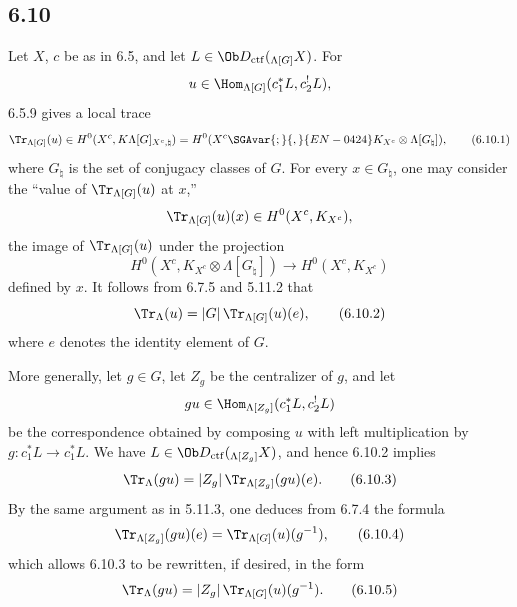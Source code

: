 \subsection*{6.10}
Let $X$, $c$ be as in 6.5, and let $L\in\Ob D_{\mathrm{ctf}}({}_{\Lambda[G]}X)$. For
\[
u\in\Hom_{\Lambda[G]}(c_1^*L,c_2^!L),
\]
6.5.9 gives a local trace
\begin{equation}
\Tr_{\Lambda[G]}(u)\in
H^0(X^c,K\Lambda[G]_{X^c,\natural})
=H^0(X^c\SGAvar{;}{,}{EN-0424}K_{X^c}\otimes\Lambda[G_{\natural}]),
\tag{6.10.1}
\end{equation}
where $G_{\natural}$ is the set of conjugacy classes of $G$. For every $x\in G_{\natural}$, one may consider the “value of $\Tr_{\Lambda[G]}(u)$ at $x$,”
\[
\Tr_{\Lambda[G]}(u)(x)\in H^0(X^c,K_{X^c}),
\]
the image of $\Tr_{\Lambda[G]}(u)$ under the projection
\[
H^0(X^c,K_{X^c}\otimes\Lambda[G_{\natural}])
\longrightarrow H^0(X^c,K_{X^c})
\]
defined by $x$. It follows from 6.7.5 and 5.11.2 that
\begin{equation}
\Tr_{\Lambda}(u)=|G|\,\Tr_{\Lambda[G]}(u)(e),
\tag{6.10.2}
\end{equation}
where $e$ denotes the identity element of $G$.

More generally, let $g\in G$, let $Z_g$ be the centralizer of $g$, and let
\[
gu\in\Hom_{\Lambda[Z_g]}(c_1^*L,c_2^!L)
\]
be the correspondence obtained by composing $u$ with left multiplication by $g:c_1^*L\to c_1^*L$. We have $L\in\Ob D_{\mathrm{ctf}}({}_{\Lambda[Z_g]}X)$, and hence 6.10.2 implies
\begin{equation}
\Tr_{\Lambda}(gu)=|Z_g|\,\Tr_{\Lambda[Z_g]}(gu)(e).
\tag{6.10.3}
\end{equation}
By the same argument as in 5.11.3, one deduces from 6.7.4 the formula
\begin{equation}
\Tr_{\Lambda[Z_g]}(gu)(e)=\Tr_{\Lambda[G]}(u)(g^{-1}),
\tag{6.10.4}
\end{equation}
which allows 6.10.3 to be rewritten, if desired, in the form
\begin{equation}
\Tr_{\Lambda}(gu)=|Z_g|\,\Tr_{\Lambda[G]}(u)(g^{-1}).
\tag{6.10.5}
\end{equation}

